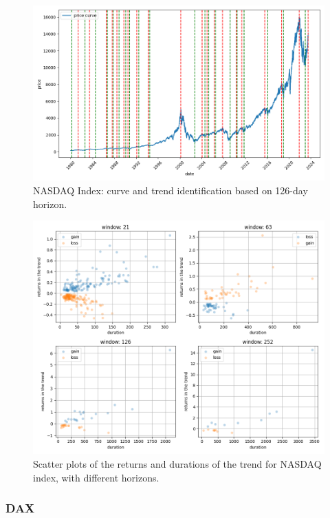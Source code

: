 \begin{figure}[h]
	\centering
	\includegraphics[width=0.8\linewidth]{chapters/chapter1/figures/curve_IXIC_126D}
	\caption{NASDAQ Index: curve and trend identification based on 126-day horizon.}
	\label{fig:curveixic126d}
\end{figure}

\begin{figure}[h]
	\centering
	\includegraphics[width=1\linewidth]{chapters/chapter1/figures/scatter_IXIC}
	\caption{Scatter plots of the returns and durations of the trend for NASDAQ index, with different horizons.}
	\label{fig:scatterixic}
\end{figure}


\subsubsection{DAX}


